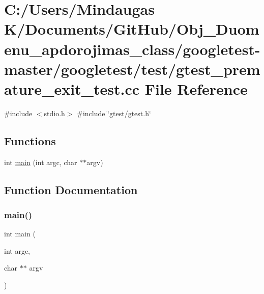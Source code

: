 \hypertarget{googletest-master_2googletest_2test_2gtest__premature__exit__test_8cc}{}\section{C\+:/\+Users/\+Mindaugas K/\+Documents/\+Git\+Hub/\+Obj\+\_\+\+Duomenu\+\_\+apdorojimas\+\_\+class/googletest-\/master/googletest/test/gtest\+\_\+premature\+\_\+exit\+\_\+test.cc File Reference}
\label{googletest-master_2googletest_2test_2gtest__premature__exit__test_8cc}
{\ttfamily \#include $<$stdio.\+h$>$}\newline
{\ttfamily \#include \char`\"{}gtest/gtest.\+h\char`\"{}}\newline
\subsection*{Functions}
\begin{DoxyCompactItemize}
\item 
int \mbox{\hyperlink{googletest-master_2googletest_2test_2gtest__premature__exit__test_8cc_a3c04138a5bfe5d72780bb7e82a18e627}{main}} (int argc, char $\ast$$\ast$argv)
\end{DoxyCompactItemize}


\subsection{Function Documentation}
\mbox{\label{googletest-master_2googletest_2test_2gtest__premature__exit__test_8cc_a3c04138a5bfe5d72780bb7e82a18e627}} 
\subsubsection{\texorpdfstring{main()}{main()}}
{\footnotesize\ttfamily int main (\begin{DoxyParamCaption}\item[{int}]{argc,  }\item[{char $\ast$$\ast$}]{argv }\end{DoxyParamCaption})}

